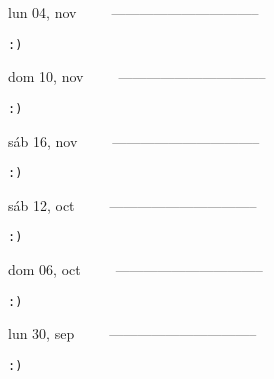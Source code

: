\documentclass[letterpaper,10pt]{article}
\begin{document}
\begin{multicols}{3}
{lun 04, nov\ \ \ \ \ --------------------------------}
\begin{flushright}\begin{small}\texttt{:)}\end{small}\end{flushright}
\vfill
{dom 10, nov\ \ \ \ \ --------------------------------}
\begin{flushright}\begin{small}\texttt{:)}\end{small}\end{flushright}\par
\vfill
{sáb 16, nov\ \ \ \ \ --------------------------------}
\begin{flushright}\begin{small}\texttt{:)}\end{small}\end{flushright}\par
\vfill
\end{multicols}
\vspace{1.05cm}

\begin{multicols}{3}
{sáb 12, oct\ \ \ \ \ --------------------------------}
\begin{flushright}\begin{small}\texttt{:)}\end{small}\end{flushright}
\vfill
{dom 06, oct\ \ \ \ \ --------------------------------}
\begin{flushright}\begin{small}\texttt{:)}\end{small}\end{flushright}\par
\vfill
{lun 30, sep\ \ \ \ \ --------------------------------}
\begin{flushright}\begin{small}\texttt{:)}\end{small}\end{flushright}\par
\vfill
\end{multicols}
\vspace{1.05cm}
\end{document}
